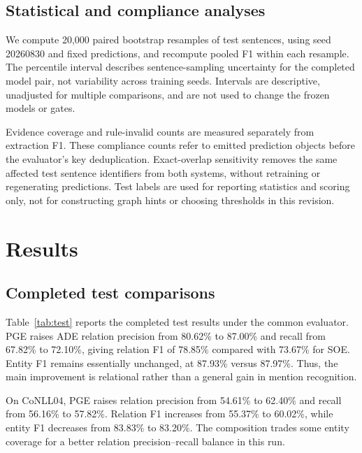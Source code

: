 \documentclass[preprint,12pt]{elsarticle}
\begin{document}
\subsection{Statistical and compliance analyses}
We compute 20,000 paired bootstrap resamples of test sentences, using seed
20260830 and fixed predictions, and recompute pooled F1 within each resample.
The percentile interval describes sentence-sampling uncertainty for the
completed model pair, not variability across training seeds. Intervals are
descriptive, unadjusted for multiple comparisons, and are not used to change
the frozen models or gates.

Evidence coverage and rule-invalid counts are measured separately from
extraction F1. These compliance counts refer to emitted prediction objects
before the evaluator's key deduplication. Exact-overlap sensitivity removes
the same affected test sentence identifiers from both systems, without
retraining or regenerating predictions. Test labels are used for reporting
statistics and scoring only, not for constructing graph hints or choosing
thresholds in this revision.

\section{Results}
\label{sec:results}
\subsection{Completed test comparisons}
Table~\ref{tab:test} reports the completed test results under the common
evaluator. PGE raises ADE relation precision from 80.62\% to 87.00\% and
recall from 67.82\% to 72.10\%, giving relation F1 of 78.85\% compared with
73.67\% for SOE. Entity F1 remains essentially unchanged, at 87.93\% versus
87.97\%. Thus, the main improvement is relational rather than a general gain
in mention recognition.

On CoNLL04, PGE raises relation precision from 54.61\% to 62.40\% and recall
from 56.16\% to 57.82\%. Relation F1 increases from 55.37\% to 60.02\%, while
entity F1 decreases from 83.83\% to 83.20\%. The composition trades some
entity coverage for a better relation precision--recall balance in this run.

\begin{table}[htbp]
\centering\scriptsize\setlength{\tabcolsep}{2.6pt}
\caption{Completed test comparisons, strict source-character-span
micro scores (\%). Qwen3-ZS is Qwen3-4B zero-shot with the recorded verifier;
GLiNER+GLiREL uses training-only calibration. Each dataset uses its own test
partition. Locally trained systems use seed 42; all rows are rescored with
the same evaluator.}
\label{tab:test}

\end{table}
\end{document}
